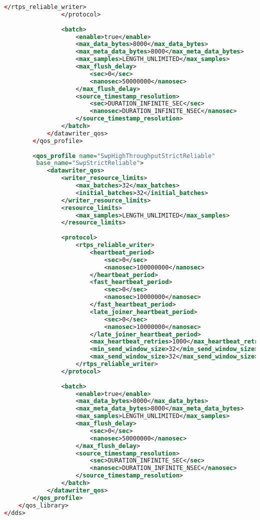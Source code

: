 \begin{lstlisting}[language=XML]
					</rtps_reliable_writer>
				</protocol>
				
				<batch>
					<enable>true</enable>
					<max_data_bytes>8000</max_data_bytes>
					<max_meta_data_bytes>8000</max_meta_data_bytes>
					<max_samples>LENGTH_UNLIMITED</max_samples>
					<max_flush_delay>
						<sec>0</sec>
						<nanosec>50000000</nanosec>
					</max_flush_delay>
					<source_timestamp_resolution>
						<sec>DURATION_INFINITE_SEC</sec>
						<nanosec>DURATION_INFINITE_NSEC</nanosec>
					</source_timestamp_resolution>
				</batch>
			</datawriter_qos>
		</qos_profile>
		
		<qos_profile name="SwpHighThroughputStrictReliable"
		 base_name="SwpStrictReliable">
			<datawriter_qos>
				<writer_resource_limits>
					<max_batches>32</max_batches>
					<initial_batches>32</initial_batches>
				</writer_resource_limits>
				<resource_limits>
					<max_samples>LENGTH_UNLIMITED</max_samples>
				</resource_limits>
		
				<protocol>
					<rtps_reliable_writer>
						<heartbeat_period>
							<sec>0</sec>
							<nanosec>100000000</nanosec>
						</heartbeat_period>
						<fast_heartbeat_period>
							<sec>0</sec>
							<nanosec>10000000</nanosec>
						</fast_heartbeat_period>
						<late_joiner_heartbeat_period>
							<sec>0</sec>
							<nanosec>10000000</nanosec>
						</late_joiner_heartbeat_period>
						<max_heartbeat_retries>1000</max_heartbeat_retries>
						<min_send_window_size>32</min_send_window_size>
						<max_send_window_size>32</max_send_window_size>
					</rtps_reliable_writer>
				</protocol>
				
				<batch>
					<enable>true</enable>
					<max_data_bytes>8000</max_data_bytes>
					<max_meta_data_bytes>8000</max_meta_data_bytes>
					<max_samples>LENGTH_UNLIMITED</max_samples>
					<max_flush_delay>
						<sec>0</sec>
						<nanosec>50000000</nanosec>
					</max_flush_delay>
					<source_timestamp_resolution>
						<sec>DURATION_INFINITE_SEC</sec>
						<nanosec>DURATION_INFINITE_NSEC</nanosec>
					</source_timestamp_resolution>
				</batch>
			</datawriter_qos>
		</qos_profile>
	</qos_library>
</dds>
\end{lstlisting}

